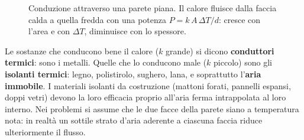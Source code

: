 \begin{figure}[!htbp]
    \centering
    \caption{Conduzione attraverso una parete piana. Il calore fluisce dalla faccia calda a quella fredda con una potenza $P = k\,A\,\Delta T / d$: cresce con l'area e con $\Delta T$, diminuisce con lo spessore.}
    \label{fig:conduzione}
\end{figure}

\begin{remark}
Le sostanze che conducono bene il calore ($k$ grande) si dicono \textbf{conduttori termici}: sono i metalli. Quelle che lo conducono male ($k$ piccolo) sono gli \textbf{isolanti termici}: legno, polistirolo, sughero, lana, e soprattutto l'\textbf{aria immobile}. I materiali isolanti da costruzione (mattoni forati, pannelli espansi, doppi vetri) devono la loro efficacia proprio all'aria ferma intrappolata al loro interno. Nei problemi si assume che le due facce della parete siano a temperatura nota: in realtà un sottile strato d'aria aderente a ciascuna faccia riduce ulteriormente il flusso.
\end{remark}

